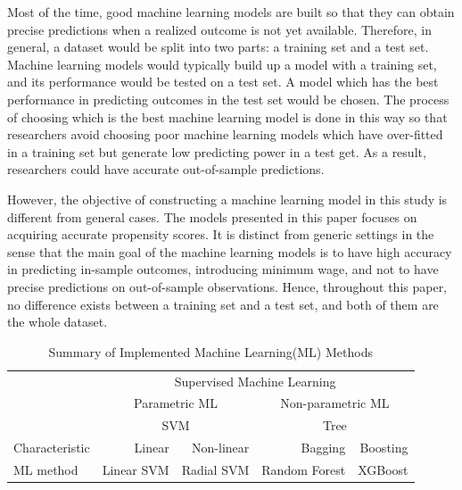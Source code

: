 \documentclass[11pt,a4paper,oneside]{article}
\begin{document}
\par
Most of the time, good machine learning models are built so that they can obtain precise predictions when a realized outcome is not yet available. Therefore, in general, a dataset would be split into two parts: a training set and a test set.  Machine learning models would typically build up a model with a training set, and its performance would be tested on a test set. A model which has the best performance in predicting outcomes in the test set would be chosen. The process of choosing which is the best machine learning model is done in this way so that researchers avoid choosing poor machine learning models which have over-fitted in a training set but generate low predicting power in a test get. As a result, researchers could have accurate out-of-sample predictions.
\par
However, the objective of constructing a machine learning model in this study is different from general cases. The models presented in this paper focuses on acquiring accurate propensity scores. It is distinct from generic settings in the sense that the main goal of the machine learning models is to have high accuracy in predicting in-sample outcomes, introducing minimum wage, and not to have precise predictions on out-of-sample observations. Hence, throughout this paper, no difference exists between a training set and a test set, and both of them are the whole dataset.

\begin{table}[t!]
	\centering
	\caption{Summary of Implemented Machine Learning(ML) Methods}
	\def\arraystretch{0.7}
	\begin{tabular}{*5c} 
		\toprule {} & \multicolumn{4}{c}{Supervised Machine Learning}\\
		{} & \multicolumn{2}{c}{Parametric ML} & \multicolumn{2}{c}{Non-parametric ML}\\
		\hline
		{} & \multicolumn{2}{c}{SVM} & \multicolumn{2}{c}{Tree}\\
		\midrule \multicolumn{1}{l|}{Characteristic} & \multicolumn{1}{r}{Linear} &\multicolumn{1}{r}{Non-linear} &\multicolumn{1}{r}{Bagging} &\multicolumn{1}{r}{Boosting}\\
		\multicolumn{1}{l|}{ML method} & \multicolumn{1}{r}{Linear SVM} &\multicolumn{1}{r}{Radial SVM} &\multicolumn{1}{r}{Random Forest} &\multicolumn{1}{r}{XGBoost}\\
	\end{tabular}
	\label{table:1}
\end{table}
\end{document}
